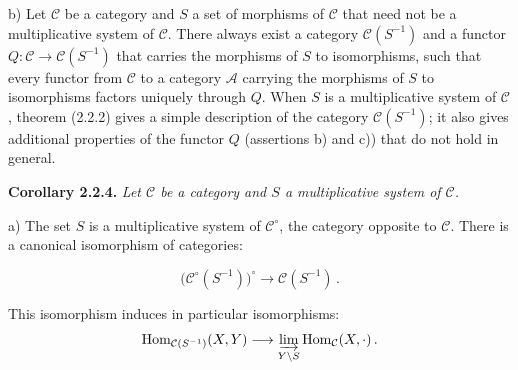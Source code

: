 \par\noindent b) Let $\mathcal C$ be a category and $S$ a set of morphisms
of $\mathcal C$ that need not be a multiplicative system of $\mathcal C$.
%
There always exist a category $\mathcal C(S^{-1})$ and a functor
$Q\colon\mathcal C\longrightarrow\mathcal C(S^{-1})$ that carries the
morphisms of $S$ to isomorphisms, such that every functor from $\mathcal C$
to a category $\mathcal A$ carrying the morphisms of $S$ to isomorphisms
factors uniquely through $Q$.
%
When $S$ is a multiplicative system of $\mathcal C$, theorem (2.2.2) gives a
simple description of the category $\mathcal C(S^{-1})$; it also gives
additional properties of the functor $Q$ (assertions b) and c)) that do not
hold in general.

\smallskip
\noindent\textbf{Corollary 2.2.4.}\quad
\begingroup\itshape
Let $\mathcal C$ be a category and $S$ a multiplicative system of
$\mathcal C$.

\par\noindent a) The set $S$ is a multiplicative system of
$\mathcal C^\circ$, the category opposite to $\mathcal C$.
%
There is a canonical isomorphism of categories:

\[
  \bigl(\mathcal C^\circ(S^{-1})\bigr)^\circ
  \longrightarrow \mathcal C(S^{-1})\,.
\]

\noindent This isomorphism induces in particular isomorphisms:
\[
  \operatorname{Hom}_{\mathcal C(S^{-1})}(X,Y)
  \longrightarrow
  \varinjlim_{Y\backslash S}\operatorname{Hom}_{\mathcal C}(X,\mathord\cdot)\,.
\]
\endgroup

\endgroup
